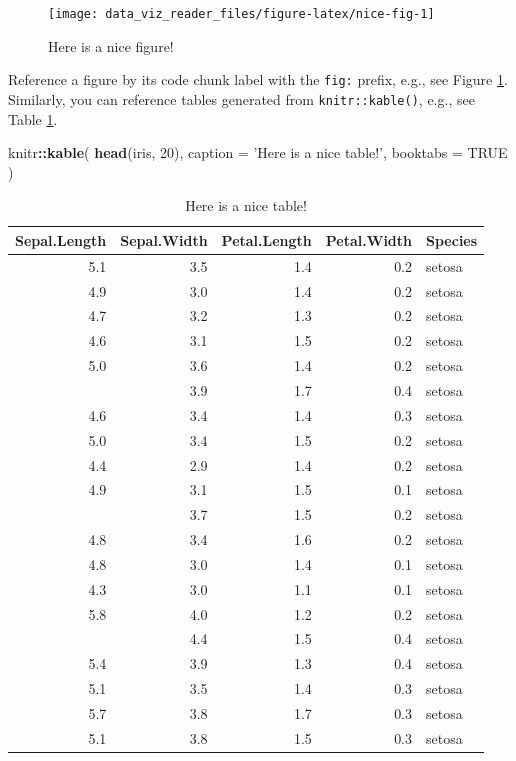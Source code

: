 \documentclass[]{book}
\newenvironment{Shaded}{\begin{snugshade}}{\end{snugshade}}
\newcommand{\KeywordTok}[1]{\textcolor[rgb]{0.13,0.29,0.53}{\textbf{#1}}}
\newcommand{\DataTypeTok}[1]{\textcolor[rgb]{0.13,0.29,0.53}{#1}}
\newcommand{\DecValTok}[1]{\textcolor[rgb]{0.00,0.00,0.81}{#1}}
\newcommand{\StringTok}[1]{\textcolor[rgb]{0.31,0.60,0.02}{#1}}
\newcommand{\OtherTok}[1]{\textcolor[rgb]{0.56,0.35,0.01}{#1}}
\newcommand{\OperatorTok}[1]{\textcolor[rgb]{0.81,0.36,0.00}{\textbf{#1}}}
\newcommand{\NormalTok}[1]{#1}
\begin{document}
\begin{figure}

{\centering \texttt{[image: data\_viz\_reader\_files/figure-latex/nice-fig-1]} 

}

\caption{Here is a nice figure!}\label{fig:nice-fig}
\end{figure}

Reference a figure by its code chunk label with the \texttt{fig:}
prefix, e.g., see Figure \ref{fig:nice-fig}. Similarly, you can
reference tables generated from \texttt{knitr::kable()}, e.g., see Table
\ref{tab:nice-tab}.

\begin{Shaded}
\begin{Highlighting}[]
\NormalTok{knitr}\OperatorTok{::}\KeywordTok{kable}\NormalTok{(}
 \KeywordTok{head}\NormalTok{(iris, }\DecValTok{20}\NormalTok{), }\DataTypeTok{caption =} \StringTok{'Here is a nice table!'}\NormalTok{,}
 \DataTypeTok{booktabs =} \OtherTok{TRUE}
\NormalTok{)}
\end{Highlighting}
\end{Shaded}

\begin{table}[t]

\caption{\label{tab:nice-tab}Here is a nice table!}
\centering
\begin{tabular}{rrrrl}
\toprule
Sepal.Length & Sepal.Width & Petal.Length & Petal.Width & Species\\
\midrule
5.1 & 3.5 & 1.4 & 0.2 & setosa\\
4.9 & 3.0 & 1.4 & 0.2 & setosa\\
4.7 & 3.2 & 1.3 & 0.2 & setosa\\
4.6 & 3.1 & 1.5 & 0.2 & setosa\\
5.0 & 3.6 & 1.4 & 0.2 & setosa\\
\addlinespace
5.4 & 3.9 & 1.7 & 0.4 & setosa\\
4.6 & 3.4 & 1.4 & 0.3 & setosa\\
5.0 & 3.4 & 1.5 & 0.2 & setosa\\
4.4 & 2.9 & 1.4 & 0.2 & setosa\\
4.9 & 3.1 & 1.5 & 0.1 & setosa\\
\addlinespace
5.4 & 3.7 & 1.5 & 0.2 & setosa\\
4.8 & 3.4 & 1.6 & 0.2 & setosa\\
4.8 & 3.0 & 1.4 & 0.1 & setosa\\
4.3 & 3.0 & 1.1 & 0.1 & setosa\\
5.8 & 4.0 & 1.2 & 0.2 & setosa\\
\addlinespace
5.7 & 4.4 & 1.5 & 0.4 & setosa\\
5.4 & 3.9 & 1.3 & 0.4 & setosa\\
5.1 & 3.5 & 1.4 & 0.3 & setosa\\
5.7 & 3.8 & 1.7 & 0.3 & setosa\\
5.1 & 3.8 & 1.5 & 0.3 & setosa\\
\bottomrule
\end{tabular}
\end{table}
\end{document}
